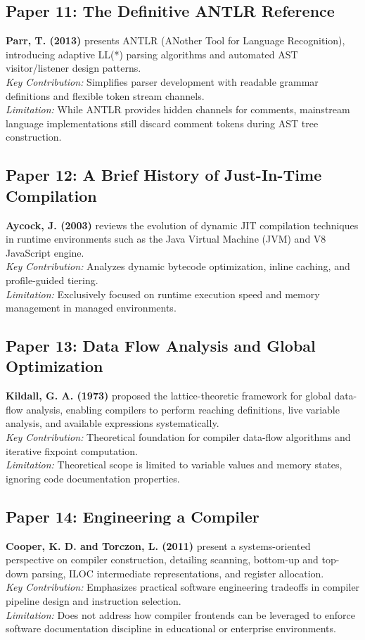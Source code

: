 \subsection{Paper 11: The Definitive ANTLR Reference}
\textbf{Parr, T. (2013)} \cite{parr2013definitive} presents ANTLR (ANother Tool for Language Recognition), introducing adaptive LL(*) parsing algorithms and automated AST visitor/listener design patterns. \\
\textit{Key Contribution:} Simplifies parser development with readable grammar definitions and flexible token stream channels. \\
\textit{Limitation:} While ANTLR provides hidden channels for comments, mainstream language implementations still discard comment tokens during AST tree construction.

\subsection{Paper 12: A Brief History of Just-In-Time Compilation}
\textbf{Aycock, J. (2003)} \cite{aycock2003brief} reviews the evolution of dynamic JIT compilation techniques in runtime environments such as the Java Virtual Machine (JVM) and V8 JavaScript engine. \\
\textit{Key Contribution:} Analyzes dynamic bytecode optimization, inline caching, and profile-guided tiering. \\
\textit{Limitation:} Exclusively focused on runtime execution speed and memory management in managed environments.

\subsection{Paper 13: Data Flow Analysis and Global Optimization}
\textbf{Kildall, G. A. (1973)} \cite{kildall1973unified} proposed the lattice-theoretic framework for global data-flow analysis, enabling compilers to perform reaching definitions, live variable analysis, and available expressions systematically. \\
\textit{Key Contribution:} Theoretical foundation for compiler data-flow algorithms and iterative fixpoint computation. \\
\textit{Limitation:} Theoretical scope is limited to variable values and memory states, ignoring code documentation properties.

\subsection{Paper 14: Engineering a Compiler}
\textbf{Cooper, K. D. and Torczon, L. (2011)} \cite{cooper2011engineering} present a systems-oriented perspective on compiler construction, detailing scanning, bottom-up and top-down parsing, ILOC intermediate representations, and register allocation. \\
\textit{Key Contribution:} Emphasizes practical software engineering tradeoffs in compiler pipeline design and instruction selection. \\
\textit{Limitation:} Does not address how compiler frontends can be leveraged to enforce software documentation discipline in educational or enterprise environments.

